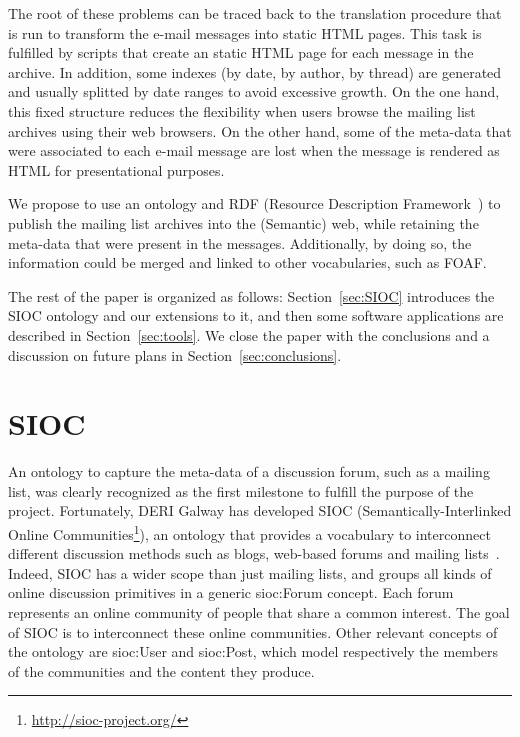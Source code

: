 \documentclass{llncs}
\begin{document}
The root of these problems can be traced back to the translation
procedure that is run to transform the e-mail messages into static
HTML pages. This task is fulfilled by scripts that create an
static HTML page for each message in the archive. In addition,
some indexes (by date, by author, by thread) are generated and
usually splitted by date ranges to avoid excessive growth.
On the one hand, this 
fixed structure reduces the flexibility when users browse the
mailing list archives using their web browsers. On the other hand, some 
of the meta-data that were associated to each e-mail message are lost
when the message is rendered as HTML for presentational purposes.

We propose to use an ontology and RDF (Resource Description
Framework~\cite{RDF}) to publish the mailing list archives into 
the (Semantic) web, while retaining the meta-data that were present in 
the messages. Additionally, by doing so, the information could be
merged and linked to other vocabularies, such as FOAF.

The rest of the paper is organized as follows: 
Section~\ref{sec:SIOC} introduces the SIOC ontology and our extensions 
to it, and then some software applications are described in 
Section~\ref{sec:tools}. We close the paper with the conclusions and 
a discussion on future plans in Section~\ref{sec:conclusions}.

\section{\label{sec:SIOC}SIOC}

An ontology to capture the meta-data of a discussion forum, such as
a mailing list, was clearly recognized as the first milestone to
fulfill the purpose of the project. Fortunately, DERI Galway has 
developed SIOC (Semantically-Interlinked Online
Communities\footnote{\url{http://sioc-project.org/}}), an ontology that provides a vocabulary to interconnect 
different discussion methods such as blogs, web-based forums and mailing 
lists~\cite{Breslin2006,Breslin2005}. Indeed, SIOC has a wider 
scope than just mailing lists, and groups all kinds of online discussion 
primitives in a generic \textsf{sioc:Forum} concept. Each forum represents 
an online community of people that share a common interest. The goal 
of SIOC is to interconnect these online communities. Other relevant concepts 
of the ontology are \textsf{sioc:User} and \textsf{sioc:Post}, which 
model respectively the members of the communities and the content they 
produce.
\end{document}
